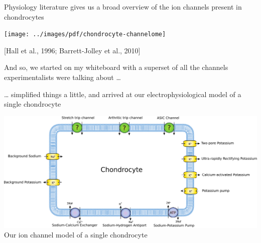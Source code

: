 \documentclass[ignorenonframetext]{beamer}
\newcommand{\references}[1] {
  \begin{flushright}
    \scriptsize [#1] \normalsize
  \end{flushright}
}
\begin{document}
%
%
%

\begin{frame}{Physiology literature gives us a broad overview of the
    ion channels present in chondrocytes}

  \vspace{0.4cm}
  \texttt{[image: ../images/pdf/chondrocyte-channelome]}

  \references{Hall et al., 1996; Barrett-Jolley et al., 2010}

\end{frame}


\begin{frame}{And so, we started on my whiteboard with a superset of
    all the channels experimentalists were talking about \ldots}

  \begin{center}
  \end{center}

\end{frame}

%
%

\begin{frame}{\ldots{} simplified things a little, and arrived at our
    electrophysiological model of a single chondrocyte}

  \begin{center}
    \includegraphics[width=\textwidth]{../images/pdf/chondrocyte-model-cellml}
    {\\[-0.1cm] \scriptsize Our ion channel model of a single chondrocyte}
  \end{center}

\end{frame}
\end{document}
